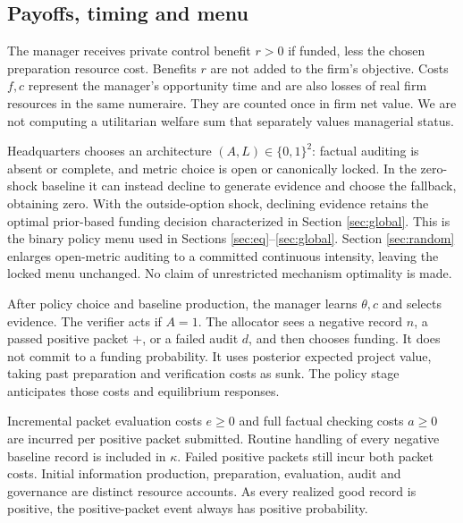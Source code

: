 \documentclass[11pt]{article}
\begin{document}
\subsection{Payoffs, timing and menu}\label{subsec:timing}
The manager receives private control benefit $r>0$ if funded, less the chosen preparation resource cost. Benefits $r$ are not added to the firm's objective. Costs $f,c$ represent the manager's opportunity time and are also losses of real firm resources in the same numeraire. They are counted once in firm net value. We are not computing a utilitarian welfare sum that separately values managerial status.

Headquarters chooses an architecture $(A,L)\in\{0,1\}^2$: factual auditing is absent or complete, and metric choice is open or canonically locked. In the zero-shock baseline it can instead decline to generate evidence and choose the fallback, obtaining zero. With the outside-option shock, declining evidence retains the optimal prior-based funding decision characterized in Section \ref{sec:global}. This is the binary policy menu used in Sections \ref{sec:eq}--\ref{sec:global}. Section \ref{sec:random} enlarges open-metric auditing to a committed continuous intensity, leaving the locked menu unchanged. No claim of unrestricted mechanism optimality is made.

After policy choice and baseline production, the manager learns $\theta,c$ and selects evidence. The verifier acts if $A=1$. The allocator sees a negative record $n$, a passed positive packet $+$, or a failed audit $d$, and then chooses funding. It does not commit to a funding probability. It uses posterior expected project value, taking past preparation and verification costs as sunk. The policy stage anticipates those costs and equilibrium responses.

Incremental packet evaluation costs $e\geq0$ and full factual checking costs $a\geq0$ are incurred per positive packet submitted. Routine handling of every negative baseline record is included in $\kappa$. Failed positive packets still incur both packet costs. Initial information production, preparation, evaluation, audit and governance are distinct resource accounts. As every realized good record is positive, the positive-packet event always has positive probability.
\end{document}
